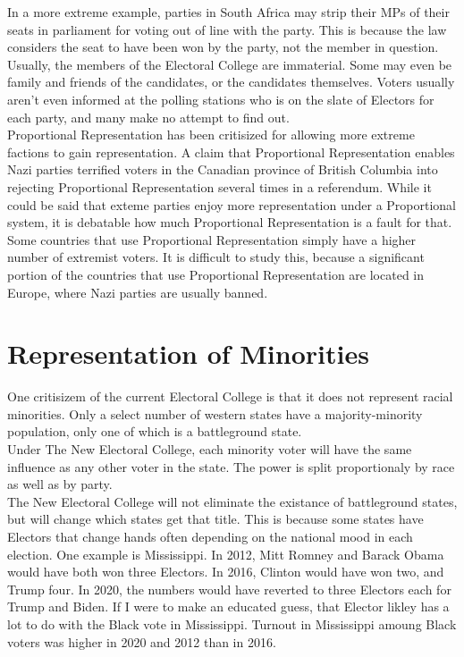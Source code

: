 \documentclass{article}
\begin{document}
    In a more extreme example, parties in South Africa may strip their MPs of their seats in parliament for voting out of line with the party. This is because the law considers the seat to have been won by the party, not the member in question.\\

    Usually, the members of the Electoral College are immaterial. Some may even be family and friends of the candidates, or the candidates themselves. Voters usually aren't even informed at the polling stations who is on the slate of Electors for each party, and many make no attempt to find out.\\

    Proportional Representation has been critisized for allowing more extreme factions to gain representation. A claim that Proportional Representation enables Nazi parties terrified voters in the Canadian province of British Columbia into rejecting Proportional Representation several times in a referendum. While it could be said that exteme parties enjoy more representation under a Proportional system, it is debatable how much Proportional Representation is a fault for that. Some countries that use Proportional Representation simply have a higher number of extremist voters. It is difficult to study this, because a significant portion of the countries that use Proportional Representation are located in Europe, where Nazi parties are usually banned.\\

    \section{Representation of Minorities}%

    One critisizem of the current Electoral College is that it does not represent racial minorities. Only a select number of western states have a majority-minority population, only one of which is a battleground state.\\

    Under The New Electoral College, each minority voter will have the same influence as any other voter in the state. The power is split proportionaly by race as well as by party.\\

    The New Electoral College will not eliminate the existance of battleground states, but will change which states get that title. This is because some states have Electors that change hands often depending on the national mood in each election. One example is Mississippi. In 2012, Mitt Romney and Barack Obama would have both won three Electors. In 2016, Clinton would have won two, and Trump four. In 2020, the numbers would have reverted to three Electors each for Trump and Biden. If I were to make an educated guess, that Elector likley has a lot to do with the Black vote in Mississippi. Turnout in Mississippi amoung Black voters was higher in 2020 and 2012 than in 2016.\\
\end{document}
